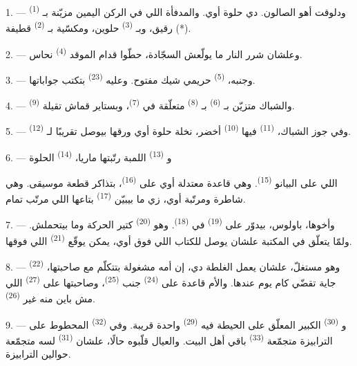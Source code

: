 1. --- ودلوقت أهو الصالون. دي  حلوة أوي. والمدفأة اللي في الركن
اليمين مزيّنة بـ \textsuperscript{(1)} رقيق، وبـ
\textsuperscript{(3)} حلوين، ومكسّية بـ \textsuperscript{(2)} قطيفة (*).

2. --- وعلشان شرر النار ما يولّعش السجّادة، حطّوا قدام الموقد 
\textsuperscript{(4)} نحاس.

3. --- وجنبه،  \textsuperscript{(5)} حريمي شيك مفتوح. وعليه  \textsuperscript{(23)} بتكتب جواباتها.

4. --- والشباك متزيّن بـ \textsuperscript{(6)} بـ
\textsuperscript{(8)} متعلّقة في  \textsuperscript{(7)}، وبستاير قماش تقيلة
 \textsuperscript{(9)}.

5. --- وفي جوز الشباك،  \textsuperscript{(11)} فيها 
\textsuperscript{(10)} أخضر، نخلة حلوة أوي ورقها بيوصل تقريبًا لـ
\textsuperscript{(12)}.

6. --- و \textsuperscript{(13)} اللمبة رتّبتها ماريا،
 \textsuperscript{(14)} الحلوة

اللي على البيانو \textsuperscript{(15)}. وهي قاعدة معتدلة أوي على  \textsuperscript{(16)}، بتذاكر قطعة موسيقى. وهي شاطرة ومرتّبة أوي، زي ما
بيبيّن  \textsuperscript{(17)} بتاعها اللي مرتّب تمام.

\VUsaut{5.0mm}
\VUsaut{3.0mm}

7. --- وأخوها، باولوس، بيدوّر على  \textsuperscript{(19)} في
 \textsuperscript{(18)}. وهو  \textsuperscript{(20)} كتير الحركة
وما بيتحملش. ولمّا يتعلّق في المكتبة علشان يوصل للكتاب اللي فوق أوي، يمكن
يوقّع  \textsuperscript{(21)} اللي فوقها.

8. --- وهو مستغلّ، علشان يعمل الغلطة دي، إن أمه مشغولة بتتكلّم مع صاحبتها،
 \textsuperscript{(22)} جاية تقضّي كام يوم عندها. والأم قاعدة على
 \textsuperscript{(24)} جنب  \textsuperscript{(25)}، وصاحبتها
على  \textsuperscript{(27)} اللي مش باين منه غير 
\textsuperscript{(26)}.

9. --- و \textsuperscript{(30)} الكبير المعلّق على الحيطة فيه
 \textsuperscript{(29)} واحدة قريبة. وفي 
\textsuperscript{(32)} المحطوط على الترابيزة متجمّعة  \textsuperscript{(33)}
باقي أهل البيت. والعيال قلّبوه حالًا، علشان  \textsuperscript{(31)}
لسه متجمّعة حوالين الترابيزة.

